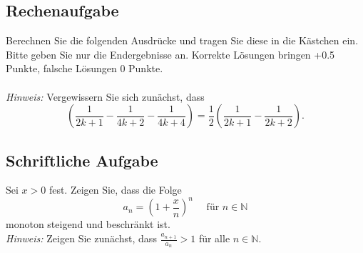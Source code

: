 \documentclass[a4paper]{article}
\begin{document}
\subsection{Rechenaufgabe}
Berechnen Sie die folgenden Ausdrücke und tragen Sie diese in die Kästchen ein. Bitte geben Sie nur die Endergebnisse an. Korrekte Lösungen bringen +0.5 Punkte, falsche Lösungen 0 Punkte.\\\\
\fbox{\parbox{\linewidth}{
\[\sum\limits^\infty_{k=1}\left(-\frac{1}{3}\right)^k=-\frac{1}{4}\]
}}\vspace*{5mm}
\fbox{\parbox{\linewidth}{
\[\sum\limits^\infty_{k=5}\left(\frac{1}{2}\right)^{2k+1}=\frac{1}{6}\]
}}\vspace*{5mm}
\fbox{\parbox{\linewidth}{
\[\sum\limits^\infty_{k=1}\left(\frac{1}{2k+1}-\frac{1}{2k+2}\right)=0\]
}}\vspace*{5mm}
\fbox{\parbox{\linewidth}{
\[\sum\limits^\infty_{k=1}\left(-\frac{1}{3}\right)^k=-\frac{1}{4}\]
}}\vspace*{5mm}
\textit{Hinweis:} Vergewissern Sie sich zunächst, dass
\[\left(\frac{1}{2k+1}-\frac{1}{4k+2}-\frac{1}{4k+4}\right)=\frac{1}{2}\left(\frac{1}{2k+1}-\frac{1}{2k+2}\right).\]
\subsection{Schriftliche Aufgabe}
Sei $x>0$ fest. Zeigen Sie, dass die Folge
\[a_n=\left(1+\frac{x}{n}\right)^n\quad \text{ für } n\in\mathbb{N}\]
monoton steigend und beschränkt ist.\\
\textit{Hinweis:} Zeigen Sie zunächst, dass $\frac{a_{n+1}}{a_n}>1$ für alle $n\in\mathbb{N}$.
\end{document}
